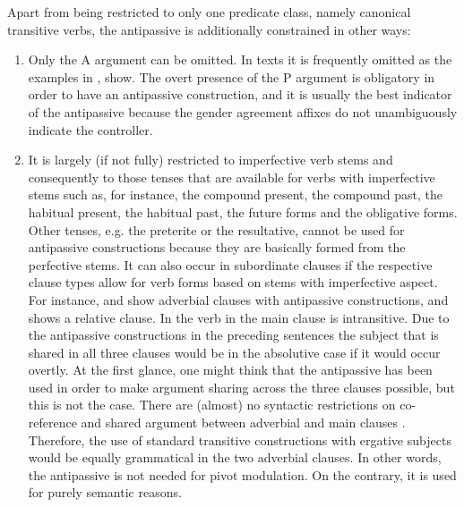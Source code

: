 Apart from being restricted to only one predicate class, namely canonical transitive verbs, the antipassive is additionally constrained in other ways:
%
\begin{enumerate}
	\item	Only the A argument can be omitted. In texts it is frequently omitted as the examples in ,  show. The overt presence of the P argument is obligatory in order to have an antipassive construction, and it is usually the best indicator of the antipassive because the gender agreement affixes do not unambiguously indicate the controller.

	\item	It is largely (if not fully) restricted to imperfective verb stems and consequently to those tenses that are available for verbs with imperfective stems such as, for instance, the compound present, the compound past, the habitual present, the habitual past, the future forms and the obligative forms. Other tenses, e.g. the preterite or the resultative, cannot be used for antipassive constructions because they are basically formed from the perfective stems. It can also occur in subordinate clauses if the respective clause types allow for verb forms based on stems with imperfective aspect. For instance,  and  show adverbial clauses with antipassive constructions, and  shows a relative clause. In  the verb in the main clause is intransitive. Due to the antipassive constructions in the preceding sentences the subject that is shared in all three clauses would be in the absolutive case if it would occur overtly. At the first glance, one might think that the antipassive has been used in order to make argument sharing across the three clauses possible, but this is not the case. There are (almost) no syntactic restrictions on co-reference and shared argument between adverbial and main clauses . Therefore, the use of standard transitive constructions with ergative subjects would be equally grammatical in the two adverbial clauses. In other words, the antipassive is not needed for pivot modulation. On the contrary, it is used for purely semantic reasons. 
	\begin{exe}
		

\end{exe}
\end{enumerate}

